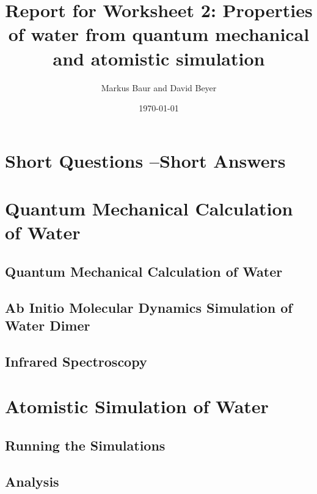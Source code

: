 \documentclass[a4paper,10pt,bibtotoc]{scrartcl}
\begin{document}
\titlehead{Simulation Methods in Physics II \hfill SS 2020}
\title{Report for Worksheet 2: Properties of water from quantum mechanical and atomistic simulation}
\author{Markus Baur and David Beyer}
\date{\today}
\maketitle

\tableofcontents

\section{Short Questions --Short Answers}

\section{Quantum Mechanical Calculation of Water}
\subsection*{Quantum Mechanical Calculation of Water}
\subsection*{Ab Initio Molecular Dynamics Simulation of Water Dimer}
\subsection*{Infrared Spectroscopy}

\section{Atomistic Simulation of Water}
\subsection*{Running the Simulations}
\subsection*{Analysis}
\end{document}
